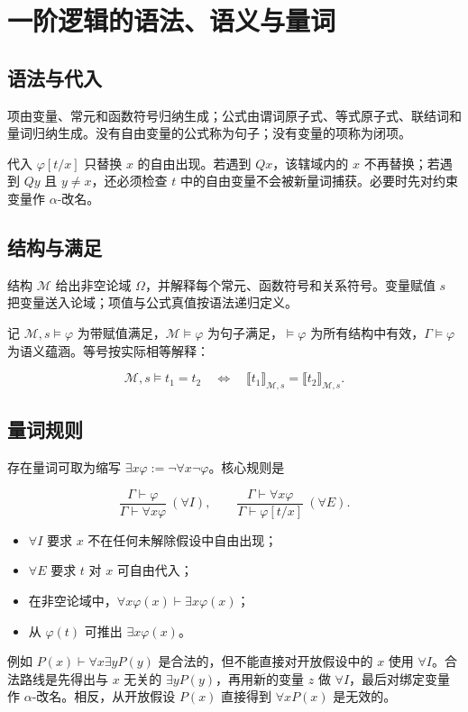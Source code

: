 \section{一阶逻辑的语法、语义与量词}


\subsection{语法与代入}


项由变量、常元和函数符号归纳生成；公式由谓词原子式、等式原子式、联结词和量词归纳生成。没有自由变量的公式称为句子；没有变量的项称为闭项。

代入 $\varphi[t/x]$ 只替换 $x$ 的自由出现。若遇到 $Qx$，该辖域内的 $x$ 不再替换；若遇到 $Qy$ 且 $y\ne x$，还必须检查 $t$ 中的自由变量不会被新量词捕获。必要时先对约束变量作 $\alpha$-改名。

\subsection{结构与满足}


结构 $\mathcal M$ 给出非空论域 $\Omega$，并解释每个常元、函数符号和关系符号。变量赋值 $s$ 把变量送入论域；项值与公式真值按语法递归定义。

记 $\mathcal M,s\models\varphi$ 为带赋值满足，$\mathcal M\models\varphi$ 为句子满足，$\models\varphi$ 为所有结构中有效，$\Gamma\models\varphi$ 为语义蕴涵。等号按实际相等解释：

\[
\mathcal M,s\models t_1=t_2
\quad\Longleftrightarrow\quad
\llbracket t_1\rrbracket_{\mathcal M,s}=\llbracket t_2\rrbracket_{\mathcal M,s}.
\]

\subsection{量词规则}


存在量词可取为缩写 $\exists x\varphi:=\neg\forall x\neg\varphi$。核心规则是

\[
\frac{\Gamma\vdash\varphi}{\Gamma\vdash\forall x\varphi}\ (\forall I),
\qquad
\frac{\Gamma\vdash\forall x\varphi}{\Gamma\vdash\varphi[t/x]}\ (\forall E).
\]

\begin{itemize}
\item $\forall I$ 要求 $x$ 不在任何未解除假设中自由出现；
\item $\forall E$ 要求 $t$ 对 $x$ 可自由代入；
\item 在非空论域中，$\forall x\varphi(x)\vdash\exists x\varphi(x)$；
\item 从 $\varphi(t)$ 可推出 $\exists x\varphi(x)$。
\end{itemize}


例如 $P(x)\vdash\forall x\exists yP(y)$ 是合法的，但不能直接对开放假设中的 $x$ 使用 $\forall I$。合法路线是先得出与 $x$ 无关的 $\exists yP(y)$，再用新的变量 $z$ 做 $\forall I$，最后对绑定变量作 $\alpha$-改名。相反，从开放假设 $P(x)$ 直接得到 $\forall xP(x)$ 是无效的。
